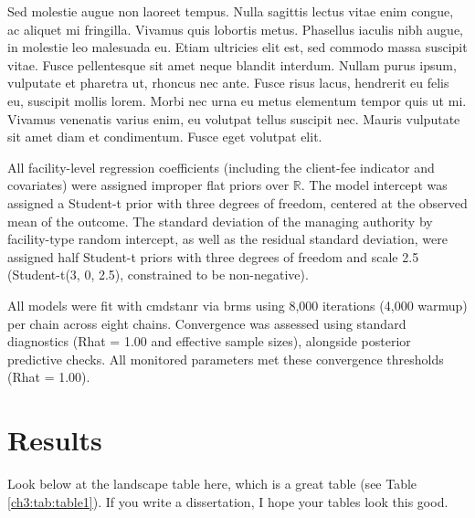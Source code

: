 Sed molestie augue non laoreet tempus. Nulla sagittis lectus vitae enim congue, ac aliquet mi fringilla. Vivamus quis lobortis metus. Phasellus iaculis nibh augue, in molestie leo malesuada eu. Etiam ultricies elit est, sed commodo massa suscipit vitae. Fusce pellentesque sit amet neque blandit interdum. Nullam purus ipsum, vulputate et pharetra ut, rhoncus nec ante. Fusce risus lacus, hendrerit eu felis eu, suscipit mollis lorem. Morbi nec urna eu metus elementum tempor quis ut mi. Vivamus venenatis varius enim, eu volutpat tellus suscipit nec. Mauris vulputate sit amet diam et condimentum. Fusce eget volutpat elit. 

All facility-level regression coefficients (including the client-fee indicator and covariates) were assigned improper flat priors over $\mathbb{R}$. The model intercept was assigned a Student-t prior with three degrees of freedom, centered at the observed mean of the outcome. The standard deviation of the managing authority by facility-type random intercept, as well as the residual standard deviation, were assigned half Student-t priors with three degrees of freedom and scale 2.5 (Student-t(3, 0, 2.5), constrained to be non-negative).

All models were fit with cmdstanr via brms using 8,000 iterations (4,000 warmup) per chain across eight chains. Convergence was assessed using standard diagnostics (Rhat = 1.00 and effective sample sizes), alongside posterior predictive checks. All monitored parameters met these convergence thresholds (Rhat = 1.00).

\section{Results}

Look below at the landscape table here, which is a great table (see Table \ref{ch3:tab:table1}). If you write a dissertation, I hope your tables look this good.

